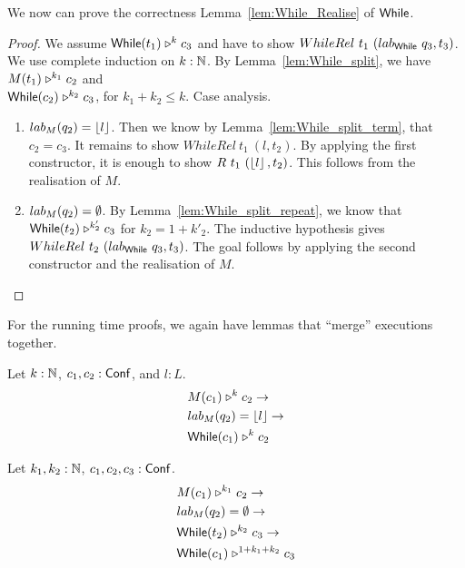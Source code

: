 We now can prove the correctness Lemma~\ref{lem:While_Realise} of $\mathsf{While}$.
\begin{proof}
  We assume $\mathsf{While}(t_1) \mathrel{\triangleright}^k c_3$ and have to show $WhileRel~t_1~(lab_{\mathsf{While}}~q_3, t_3)$.  We use complete induction on $k:\mathbb{N}$.  By
  Lemma~\ref{lem:While_split}, we have $M(t_1) \mathrel{\triangleright}^{k_1} c_2$ and\\ $\mathsf{While}(c_2) \mathrel{\triangleright}^{k_2} c_3$, for $k_1+k_2 \leq k$.  Case analysis.
  \begin{enumerate}
  \item $lab_M(q_2) = \left\lfloor {l} \right\rfloor$.  Then we know by Lemma~\ref{lem:While_split_term}, that $c_2=c_3$.  It remains to show $WhileRel~t_1~(l, t_2)$.  By
    applying the first constructor, it is enough to show $R~t_1~(\left\lfloor {l} \right\rfloor, t_2)$.  This follows from the realisation of $M$.
  \item $lab_M(q_2) = \emptyset$.  By Lemma~\ref{lem:While_split_repeat}, we know that $\mathsf{While}(t_2) \mathrel{\triangleright}^{k'_2} c_3$ for $k_2 = 1 + k'_2$.  The
    inductive hypothesis gives $WhileRel~t_2~(lab_{\mathsf{While}}~q_3, t_3)$.  The goal follows by applying the second constructor and the realisation of $M$.
  \end{enumerate}
\end{proof}


For the running time proofs, we again have lemmas that ``merge'' executions together.

\begin{lemma}
  Let $k : \mathbb{N}$, $c_1, c_2 : \mathsf{Conf}$, and $l:L$.
  \begin{alignat*}{1}
    & M(c_1) \mathrel{\triangleright}^k c_2 \rightarrow \\
    & lab_M(q_2) = \left\lfloor {l} \right\rfloor \rightarrow \\
    & \mathsf{While}(c_1) \mathrel{\triangleright}^k c_2
  \end{alignat*}
\end{lemma}
\begin{lemma}
  Let $k_1, k_2 : \mathbb{N}$, $c_1, c_2, c_3 : \mathsf{Conf}$.
  \begin{alignat*}{1}
    & M(c_1) \mathrel{\triangleright}^{k_1} c_2 \rightarrow \\
    & lab_M(q_2) = \emptyset \rightarrow \\
    & \mathsf{While}(t_2) \mathrel{\triangleright}^{k_2} c_3 \rightarrow \\
    & \mathsf{While}(c_1) \mathrel{\triangleright}^{1+k_1+k_2} c_3
  \end{alignat*}
\end{lemma}

